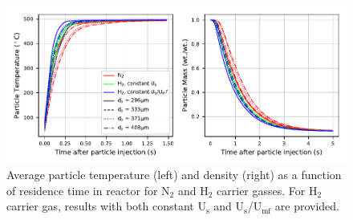\begin{figure}[H]
    \centering
    \includegraphics[width=\textwidth]{figures/cfd-constuumf-particle-temp-density.pdf}
    \caption{Average particle temperature (left) and density (right) as a function of residence time in reactor for N$_2$ and H$_2$ carrier gasses. For H$_2$ carrier gas, results with both constant U$_\text{s}$ and U$_\text{s}$/U$_\text{mf}$ are provided.}
    \label{fig:cfd-constuumf-particle-temp-density}
\end{figure}


